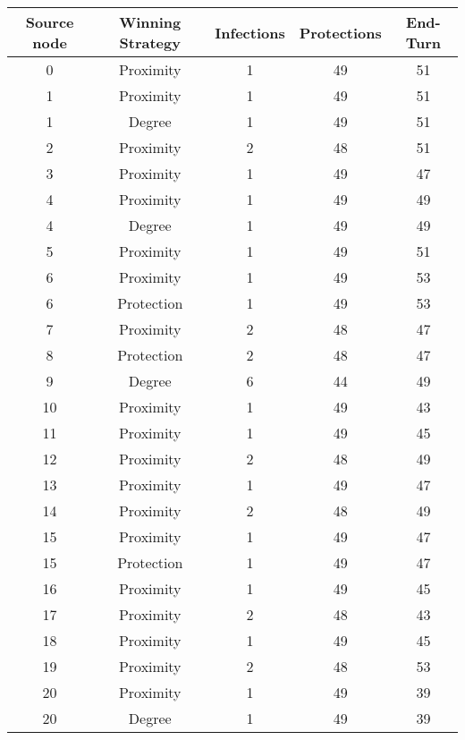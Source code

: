 \documentclass[results.tex]{subfiles}
\begin{document}
\begin{center}
  \begin{tabular}{| c || c | c | c | c |}
    \hline
    {\bfseries Source node} & {\bfseries Winning Strategy} & {\bfseries Infections} & {\bfseries Protections} & {\bfseries End-Turn} \\  %
    \hline\hline
    0 & Proximity & 1 & 49 & 51 \\ 
    \hline
    1 & Proximity & 1 & 49 & 51 \\ 
    \hline
    1 & Degree & 1 & 49 & 51 \\ 
    \hline
    2 & Proximity & 2 & 48 & 51 \\ 
    \hline
    3 & Proximity & 1 & 49 & 47 \\ 
    \hline
    4 & Proximity & 1 & 49 & 49 \\ 
    \hline
    4 & Degree & 1 & 49 & 49 \\ 
    \hline
    5 & Proximity & 1 & 49 & 51 \\ 
    \hline
    6 & Proximity & 1 & 49 & 53 \\ 
    \hline
    6 & Protection & 1 & 49 & 53 \\ 
    \hline
    7 & Proximity & 2 & 48 & 47 \\ 
    \hline
    8 & Protection & 2 & 48 & 47 \\ 
    \hline
    9 & Degree & 6 & 44 & 49 \\ 
    \hline
    10 & Proximity & 1 & 49 & 43 \\ 
    \hline
    11 & Proximity & 1 & 49 & 45 \\ 
    \hline
    12 & Proximity & 2 & 48 & 49 \\ 
    \hline
    13 & Proximity & 1 & 49 & 47 \\ 
    \hline
    14 & Proximity & 2 & 48 & 49 \\ 
    \hline
    15 & Proximity & 1 & 49 & 47 \\ 
    \hline
    15 & Protection & 1 & 49 & 47 \\ 
    \hline
    16 & Proximity & 1 & 49 & 45 \\ 
    \hline
    17 & Proximity & 2 & 48 & 43 \\ 
    \hline
    18 & Proximity & 1 & 49 & 45 \\ 
    \hline
    19 & Proximity & 2 & 48 & 53 \\ 
    \hline
    20 & Proximity & 1 & 49 & 39 \\ 
    \hline
    20 & Degree & 1 & 49 & 39 \\ 

\end{tabular}
\end{center}
\end{document}
